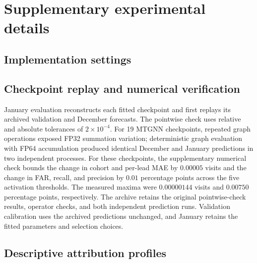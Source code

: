 \appendix
\section{Supplementary experimental details}
\label{app:experimental_details}

\subsection{Implementation settings}
\label{app:implementation_settings}


\subsection{Checkpoint replay and numerical verification}
\label{app:checkpoint_replay}
January evaluation reconstructs each fitted checkpoint and first replays its archived validation and December forecasts.
The pointwise check uses relative and absolute tolerances of $2\times10^{-4}$.
For 19 MTGNN checkpoints, repeated graph operations exposed FP32 summation variation; deterministic graph evaluation with FP64 accumulation produced identical December and January predictions in two independent processes.
For these checkpoints, the supplementary numerical check bounds the change in cohort and per-lead MAE by $0.00005$ visits and the change in FAR, recall, and precision by $0.01$ percentage points across the five activation thresholds.
The measured maxima were $0.00000144$ visits and $0.00750$ percentage points, respectively.
The archive retains the original pointwise-check results, operator checks, and both independent prediction runs.
Validation calibration uses the archived predictions unchanged, and January retains the fitted parameters and selection choices.

\subsection{Descriptive attribution profiles}
\label{app:descriptive_attribution}

